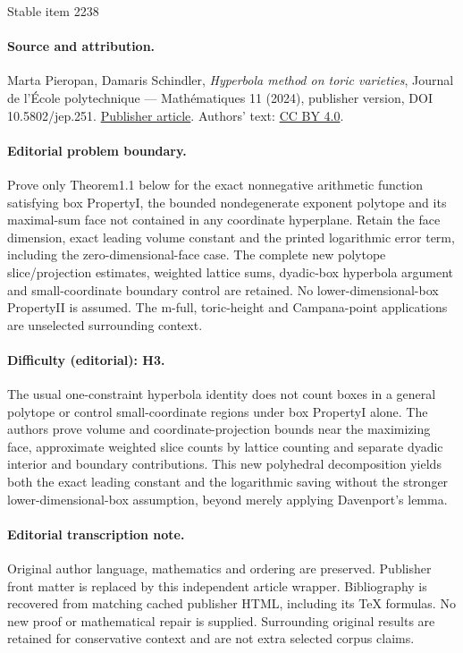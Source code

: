 \documentclass[11pt]{article}
\numberwithin{equation}{section}
\theoremstyle{definition}
\numberwithin{theorem}{section}
\begin{document}
\begin{center}{\Large Stable item 2238}\end{center}
\paragraph{Source and attribution.}
Marta Pieropan, Damaris Schindler, \emph{Hyperbola method on toric varieties}, Journal de l’École polytechnique — Mathématiques 11 (2024), publisher version, DOI 10.5802/jep.251. \href{https://jep.centre-mersenne.org/articles/10.5802/jep.251/}{Publisher article}. Authors' text: \href{https://creativecommons.org/licenses/by/4.0/}{CC BY 4.0}.
\paragraph{Editorial problem boundary.}
Prove only Theorem1.1 below for the exact nonnegative arithmetic function satisfying box PropertyI, the bounded nondegenerate exponent polytope and its maximal-sum face not contained in any coordinate hyperplane. Retain the face dimension, exact leading volume constant and the printed logarithmic error term, including the zero-dimensional-face case. The complete new polytope slice/projection estimates, weighted lattice sums, dyadic-box hyperbola argument and small-coordinate boundary control are retained. No lower-dimensional-box PropertyII is assumed. The m-full, toric-height and Campana-point applications are unselected surrounding context.
\paragraph{Difficulty (editorial): H3.}
The usual one-constraint hyperbola identity does not count boxes in a general polytope or control small-coordinate regions under box PropertyI alone. The authors prove volume and coordinate-projection bounds near the maximizing face, approximate weighted slice counts by lattice counting and separate dyadic interior and boundary contributions. This new polyhedral decomposition yields both the exact leading constant and the logarithmic saving without the stronger lower-dimensional-box assumption, beyond merely applying Davenport's lemma.
\paragraph{Editorial transcription note.}
Original author language, mathematics and ordering are preserved. Publisher front matter is replaced by this independent article wrapper. Bibliography is recovered from matching cached publisher HTML, including its TeX formulas. No new proof or mathematical repair is supplied. Surrounding original results are retained for conservative context and are not extra selected corpus claims.
\clearpage
\end{document}
